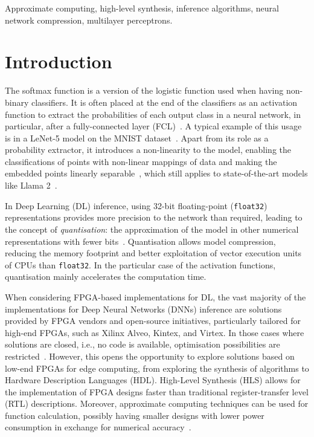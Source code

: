 \documentclass[conference]{IEEEtran}
\begin{document}
\begin{IEEEkeywords}
Approximate computing, high-level synthesis, inference algorithms, neural network compression, multilayer perceptrons.
\end{IEEEkeywords}


\section{Introduction}

The softmax function is a version of the logistic function used when having non-binary classifiers. It is often placed at the end of the classifiers as an activation function to extract the probabilities of each output class in a neural network, in particular, after a fully-connected layer (FCL)~\cite{Skansi2018}. A typical example of this usage is in a LeNet-5 model on the MNIST dataset~\cite{lenet}. Apart from its role as a probability extractor, it introduces a non-linearity to the model, enabling the classifications of points with non-linear mappings of data and making the embedded points linearly separable~\cite{nns}, which still applies to state-of-the-art models like Llama 2~\cite{llm-ecaslab}.

%
In Deep Learning (DL) inference, using 32-bit floating-point (\texttt{float32}) representations provides more precision to the network than required, leading to the concept of \emph{quantisation}: the approximation of the model in other numerical representations with fewer bits~\cite{Liang2021}. Quantisation allows model compression, reducing the memory footprint and better exploitation of vector execution units of CPUs than \texttt{float32}. In the particular case of the activation functions, quantisation mainly accelerates the computation time.


%
When considering FPGA-based implementations for DL, the vast majority of the implementations for Deep Neural Networks (DNNs) inference are solutions provided by FPGA vendors and open-source initiatives, particularly tailored for high-end FPGAs, such as Xilinx Alveo, Kintex, and Virtex. In those cases where solutions are closed, i.e., no code is available, optimisation possibilities are restricted~\cite{Liang2021}.
%
However, this opens the opportunity to explore solutions based on low-end FPGAs for edge computing, from exploring the synthesis of algorithms to Hardware Description Languages (HDL). High-Level Synthesis (HLS) allows for the implementation of FPGA designs faster than traditional register-transfer level (RTL) descriptions. Moreover, approximate computing techniques can be used for function calculation, possibly having smaller designs with lower power consumption in exchange for numerical accuracy~\cite{Zervakis2015,saadat}.
\end{document}
